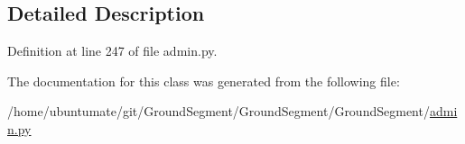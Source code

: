 \subsection{Detailed Description}


Definition at line 247 of file admin.\+py.



The documentation for this class was generated from the following file\+:\begin{DoxyCompactItemize}
\item 
/home/ubuntumate/git/\+Ground\+Segment/\+Ground\+Segment/\+Ground\+Segment/\hyperlink{admin_8py}{admin.\+py}\end{DoxyCompactItemize}
